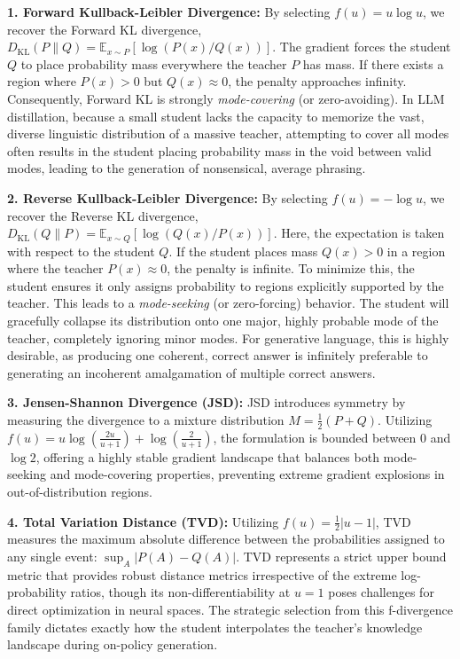 \documentclass{article} %
\begin{document}
\textbf{1. Forward Kullback-Leibler Divergence:} By selecting $f(u) = u \log u$, we recover the Forward KL divergence, $D_{\mathrm{KL}}(P \parallel Q) = \mathbb{E}_{x \sim P} [ \log(P(x)/Q(x)) ]$. The gradient forces the student $Q$ to place probability mass everywhere the teacher $P$ has mass. If there exists a region where $P(x) > 0$ but $Q(x) \approx 0$, the penalty approaches infinity. Consequently, Forward KL is strongly \textit{mode-covering} (or zero-avoiding). In LLM distillation, because a small student lacks the capacity to memorize the vast, diverse linguistic distribution of a massive teacher, attempting to cover all modes often results in the student placing probability mass in the void between valid modes, leading to the generation of nonsensical, average phrasing.

\textbf{2. Reverse Kullback-Leibler Divergence:} By selecting $f(u) = -\log u$, we recover the Reverse KL divergence, $D_{\mathrm{KL}}(Q \parallel P) = \mathbb{E}_{x \sim Q} [ \log(Q(x)/P(x)) ]$. Here, the expectation is taken with respect to the student $Q$. If the student places mass $Q(x) > 0$ in a region where the teacher $P(x) \approx 0$, the penalty is infinite. To minimize this, the student ensures it only assigns probability to regions explicitly supported by the teacher. This leads to a \textit{mode-seeking} (or zero-forcing) behavior. The student will gracefully collapse its distribution onto one major, highly probable mode of the teacher, completely ignoring minor modes. For generative language, this is highly desirable, as producing one coherent, correct answer is infinitely preferable to generating an incoherent amalgamation of multiple correct answers.

\textbf{3. Jensen-Shannon Divergence (JSD):} JSD introduces symmetry by measuring the divergence to a mixture distribution $M = \frac{1}{2}(P + Q)$. Utilizing $f(u) = u \log\left(\frac{2u}{u+1}\right) + \log\left(\frac{2}{u+1}\right)$, the formulation is bounded between 0 and $\log 2$, offering a highly stable gradient landscape that balances both mode-seeking and mode-covering properties, preventing extreme gradient explosions in out-of-distribution regions.

\textbf{4. Total Variation Distance (TVD):} Utilizing $f(u) = \frac{1}{2}|u-1|$, TVD measures the maximum absolute difference between the probabilities assigned to any single event: $\sup_{A} |P(A) - Q(A)|$. TVD represents a strict upper bound metric that provides robust distance metrics irrespective of the extreme log-probability ratios, though its non-differentiability at $u=1$ poses challenges for direct optimization in neural spaces. The strategic selection from this f-divergence family dictates exactly how the student interpolates the teacher's knowledge landscape during on-policy generation.
\end{document}
